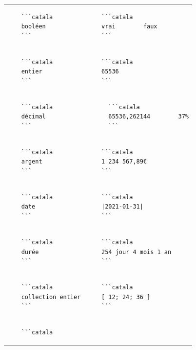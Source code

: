 \documentclass{article}
\makeatletter
\newenvironment{catala}{%
  \VerbatimEnvironment
  \let\FV@ListVSpace\relax
  \begin{verbatim}}%
 {\end{verbatim}}
\makeatother
\begin{document}
\begin{multicols}{3}
\begin{tabular}{@{}p{\cola}p{\colb}@{}}
  \begin{catala}
    ```catala
    booléen
    ```
  \end{catala}
  &
  \begin{catala}
    ```catala
    vrai        faux
    ```
  \end{catala}
  \\
  \begin{catala}
    ```catala
    entier
    ```
  \end{catala}
  &
  \begin{catala}
    ```catala
    65536
    ```
  \end{catala}
  \\
  \begin{catala}
    ```catala
    décimal
    ```
  \end{catala}
  & \begin{catala}
      ```catala
      65536,262144        37%
      ```
    \end{catala}
  \\
  \begin{catala}
    ```catala
    argent
    ```
  \end{catala}
  &
  \begin{catala}
    ```catala
    1 234 567,89€
    ```
  \end{catala}
  \\
  \begin{catala}
    ```catala
    date
    ```
  \end{catala}
  &
  \begin{catala}
    ```catala
    |2021-01-31|
    ```
  \end{catala}
  \\
  \begin{catala}
    ```catala
    durée
    ```
  \end{catala}
  &
  \begin{catala}
    ```catala
    254 jour 4 mois 1 an
    ```
  \end{catala}
  \\
  \begin{catala}
    ```catala
    collection entier
    ```
  \end{catala}
  &
  \begin{catala}
    ```catala
    [ 12; 24; 36 ]
    ```
  \end{catala}
  \\
  \begin{catala}
    ```catala

\end{catala}
\end{tabular}
\end{multicols}
\end{document}
